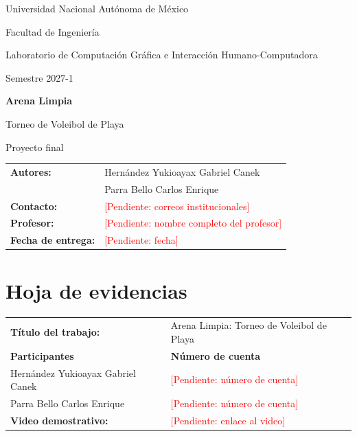 \documentclass[12pt,letterpaper]{article}
\newcommand{\pendiente}[1]{\textcolor{red}{[Pendiente: #1]}}
\begin{document}
\begin{titlepage}
  \centering
  {\large Universidad Nacional Autónoma de México\par}
  {\large Facultad de Ingeniería\par}
  \vspace{0.5cm}
  {\normalsize Laboratorio de Computación Gráfica e Interacción Humano-Computadora\par}
  {\normalsize Semestre 2027-1\par}
  \vspace{2.5cm}
  {\Huge\bfseries Arena Limpia\par}
  \vspace{0.3cm}
  {\Large Torneo de Voleibol de Playa\par}
  \vspace{0.5cm}
  {\large Proyecto final\par}
  \vfill
  \begin{tabular}{l l}
    \textbf{Autores:} & Hernández Yukioayax Gabriel Canek \\
                      & Parra Bello Carlos Enrique \\[0.3cm]
    \textbf{Contacto:} & \pendiente{correos institucionales} \\[0.3cm]
    \textbf{Profesor:} & \pendiente{nombre completo del profesor} \\[0.3cm]
    \textbf{Fecha de entrega:} & \pendiente{fecha}
  \end{tabular}
  \vspace{1.5cm}
\end{titlepage}

\section*{Hoja de evidencias}
\begin{tabular}{l l}
  \textbf{Título del trabajo:} & Arena Limpia: Torneo de Voleibol de Playa \\[0.3cm]
  \textbf{Participantes} & \textbf{Número de cuenta} \\
  Hernández Yukioayax Gabriel Canek & \pendiente{número de cuenta} \\
  Parra Bello Carlos Enrique  & \pendiente{número de cuenta} \\[0.3cm]
  \textbf{Video demostrativo:} & \pendiente{enlace al video}
\end{tabular}
\end{document}
